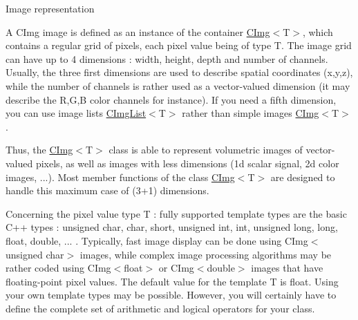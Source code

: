\begin{DoxyParagraph}{Image representation}

\end{DoxyParagraph}
A CImg image is defined as an instance of the container \hyperlink{structcimg__library_1_1CImg}{CImg}$<${\ttfamily T$>$}, which contains a regular grid of pixels, each pixel value being of type {\ttfamily T}. The image grid can have up to 4 dimensions : width, height, depth and number of channels. Usually, the three first dimensions are used to describe spatial coordinates {\ttfamily (x,y,z)}, while the number of channels is rather used as a vector-\/valued dimension (it may describe the R,G,B color channels for instance). If you need a fifth dimension, you can use image lists \hyperlink{structcimg__library_1_1CImgList}{CImgList}$<${\ttfamily T$>$} rather than simple images \hyperlink{structcimg__library_1_1CImg}{CImg}$<${\ttfamily T$>$}.

Thus, the \hyperlink{structcimg__library_1_1CImg}{CImg}$<${\ttfamily T$>$} class is able to represent volumetric images of vector-\/valued pixels, as well as images with less dimensions (1d scalar signal, 2d color images, ...). Most member functions of the class \hyperlink{structcimg__library_1_1CImg}{CImg}$<${\ttfamily T$>$} are designed to handle this maximum case of (3+1) dimensions.

Concerning the pixel value type {\ttfamily T} : fully supported template types are the basic C++ types : {\ttfamily unsigned char, char, short, unsigned int, int, unsigned long, long, float, double, ... }. Typically, fast image display can be done using {\ttfamily CImg$<$unsigned char$>$} images, while complex image processing algorithms may be rather coded using {\ttfamily CImg$<$float$>$} or {\ttfamily CImg$<$double$>$} images that have floating-\/point pixel values. The default value for the template T is {\ttfamily float}. Using your own template types may be possible. However, you will certainly have to define the complete set of arithmetic and logical operators for your class.

